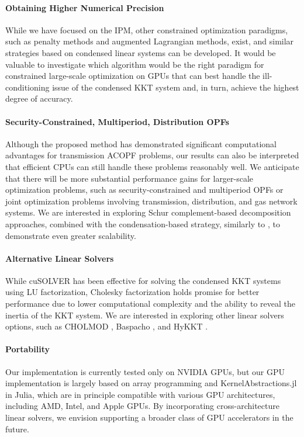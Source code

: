 \documentclass{IEEEtran4PSCC} %
\begin{document}
\paragraph*{Obtaining Higher Numerical Precision}
While we have focused on the IPM, other constrained optimization
paradigms, such as penalty methods and augmented Lagrangian methods,
exist, and similar strategies based on condensed linear systems can be
developed. It would be valuable to investigate which algorithm would
be the right paradigm for constrained large-scale optimization on GPUs
that can best handle the ill-conditioning issue of the condensed KKT
system and, in turn, achieve the highest degree of accuracy.

\paragraph*{Security-Constrained, Multiperiod, Distribution OPFs}
Although the proposed method has demonstrated significant computational
advantages for transmission ACOPF problems, our results can also
be interpreted that efficient CPUs can still handle these problems
reasonably well. We anticipate that there will be more substantial
performance gains for larger-scale optimization problems, such as
security-constrained and multiperiod OPFs or joint optimization
problems involving transmission, distribution, and gas network
systems. We are interested in exploring Schur complement-based
decomposition approaches, combined with the condensation-based
strategy, similarly to \cite{pacaud2023parallel}, to demonstrate even
greater scalability.

\paragraph*{Alternative Linear Solvers}
While cuSOLVER has been effective for solving the condensed KKT
systems using LU factorization, Cholesky factorization holds promise
for better performance due to lower computational complexity and the
ability to reveal the inertia of the KKT system. We are
interested in exploring other linear solvers options, such as CHOLMOD
\cite{chen2008algorithm}, Baspacho \cite{pineda2022theseus}, and HyKKT
\cite{regev2023hykkt}.

\paragraph*{Portability}
Our implementation is currently  tested only on NVIDIA GPUs, but our
GPU implementation is largely based on array programming and
KernelAbstractions.jl in Julia, which are in principle  compatible with
various GPU architectures, including AMD, Intel, and Apple GPUs. By
incorporating cross-architecture linear solvers, we envision
supporting a broader class of GPU accelerators in the future.
\end{document}

